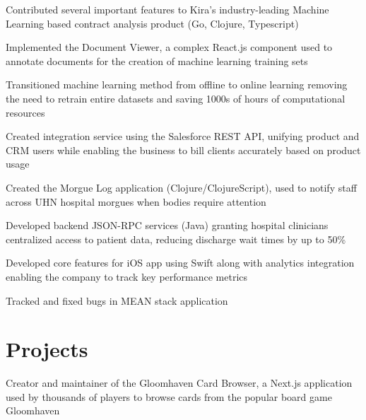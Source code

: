 \documentclass[]{resume}
\begin{document}
\begin{minipage}[t]{0.65\textwidth}
\separatorS
\begin{tightemize}
\item Contributed several important features to Kira's industry-leading Machine Learning based contract analysis product (Go, Clojure, Typescript)
\item Implemented the Document Viewer, a complex React.js component used to annotate documents for the creation of machine learning training sets
\item Transitioned machine learning method from offline to online learning removing the need to retrain entire datasets and saving 1000s of hours of computational resources
\item Created integration service using the Salesforce REST API, unifying product and CRM users while enabling the business to bill clients accurately based on product usage
\end{tightemize}
\separatorM

\separatorS
\begin{tightemize}
\item Created the Morgue Log application (Clojure/ClojureScript), used to notify staff across UHN hospital morgues when bodies require attention
\item Developed backend JSON-RPC services (Java) granting hospital clinicians centralized access to patient data, reducing discharge wait times by up to 50\%
\end{tightemize}
\separatorM

\separatorS
\begin{tightemize}
\item Developed core features for iOS app using Swift along with analytics integration enabling the company to track key performance metrics
\item Tracked and fixed bugs in MEAN stack application
\end{tightemize}
 

\section{Projects}
\separatorS
\begin{tightemize}
\item Creator and maintainer of the Gloomhaven Card Browser, a Next.js application used by thousands of players to browse cards from the popular board game Gloomhaven
\end{tightemize}
 
\end{minipage} 
\end{document}
